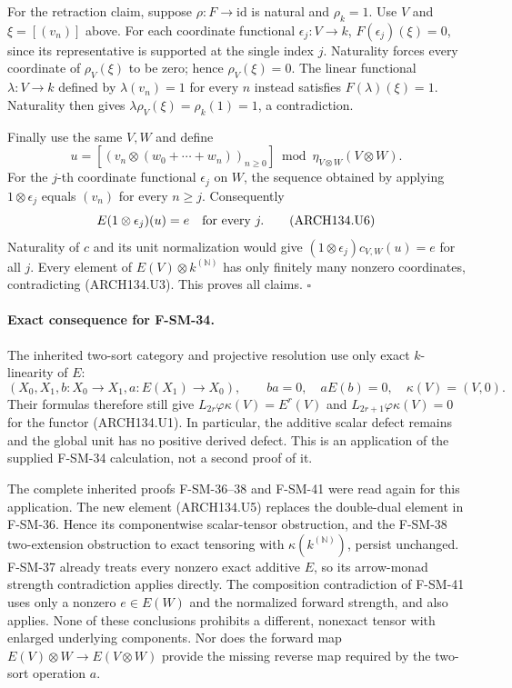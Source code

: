 For the retraction claim, suppose $\rho:F\to\mathrm{id}$ is
natural and $\rho_k=1$.  Use $V$ and $\xi=[(v_n)]$ above.
For each coordinate functional $\epsilon_j:V\to k$,
$F(\epsilon_j)(\xi)=0$, since its representative is supported
at the single index $j$.  Naturality forces every coordinate of
$\rho_V(\xi)$ to be zero; hence $\rho_V(\xi)=0$.  The linear
functional $\lambda:V\to k$ defined by $\lambda(v_n)=1$ for
every $n$ instead satisfies $F(\lambda)(\xi)=1$.
Naturality then gives
$\lambda\rho_V(\xi)=\rho_k(1)=1$, a contradiction.

Finally use the same $V,W$ and define
\[
 u=\left[(v_n\otimes(w_0+\cdots+w_n))_{n\ge0}\right]
           \bmod\eta_{V\otimes W}(V\otimes W).
 \tag{ARCH134.U5}
\]
For the $j$-th coordinate functional $\epsilon_j$ on $W$, the
sequence obtained by applying $1\otimes\epsilon_j$ equals
$(v_n)$ for every $n\ge j$.  Consequently
\[
                 E(1\otimes\epsilon_j)(u)=e
                       \quad\hbox{for every }j.
 \tag{ARCH134.U6}
\]
Naturality of $c$ and its unit normalization would give
$(1\otimes\epsilon_j)c_{V,W}(u)=e$ for all $j$.  Every element
of $E(V)\otimes k^{(\mathbb N)}$ has only finitely many nonzero
coordinates, contradicting (ARCH134.U3).  This proves all claims.
\hfill$\square$

\paragraph{Exact consequence for F-SM-34.}
The inherited two-sort category and projective resolution use
only exact $k$-linearity of $E$:
\[
 (X_0,X_1,b:X_0\to X_1,a:E(X_1)\to X_0),\qquad
 ba=0,\quad aE(b)=0,\quad \kappa(V)=(V,0).
\]
Their formulas therefore still give
$L_{2r}\varphi\kappa(V)=E^r(V)$ and
$L_{2r+1}\varphi\kappa(V)=0$ for the functor (ARCH134.U1).
In particular, the additive scalar defect remains and the global
unit has no positive derived defect.  This is an application of
the supplied F-SM-34 calculation, not a second proof of it.

The complete inherited proofs F-SM-36--38 and F-SM-41 were read
again for this application.  The new element (ARCH134.U5)
replaces the double-dual element in F-SM-36.  Hence its componentwise
scalar-tensor obstruction, and the F-SM-38 two-extension obstruction
to exact tensoring with $\kappa(k^{(\mathbb N)})$, persist unchanged.
F-SM-37 already treats every nonzero exact additive $E$, so its
arrow-monad strength contradiction applies directly.  The
composition contradiction of F-SM-41 uses only a nonzero
$e\in E(W)$ and the normalized forward strength, and also applies.
None of these conclusions prohibits a different, nonexact tensor
with enlarged underlying components.  Nor does the forward map
$E(V)\otimes W\to E(V\otimes W)$ provide the missing reverse
map required by the two-sort operation $a$.

